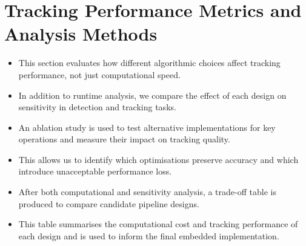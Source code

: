 \section{Tracking Performance Metrics and Analysis Methods}

\begin{itemize}
    \item This section evaluates how different algorithmic choices affect tracking performance, not just computational speed.
    \item In addition to runtime analysis, we compare the effect of each design on sensitivity in detection and tracking tasks.
    \item An ablation study is used to test alternative implementations for key operations and measure their impact on tracking quality.
    \item This allows us to identify which optimisations preserve accuracy and which introduce unacceptable performance loss.
    \item After both computational and sensitivity analysis, a trade-off table is produced to compare candidate pipeline designs.
    \item This table summarises the computational cost and tracking performance of each design and is used to inform the final embedded implementation.
\end{itemize}